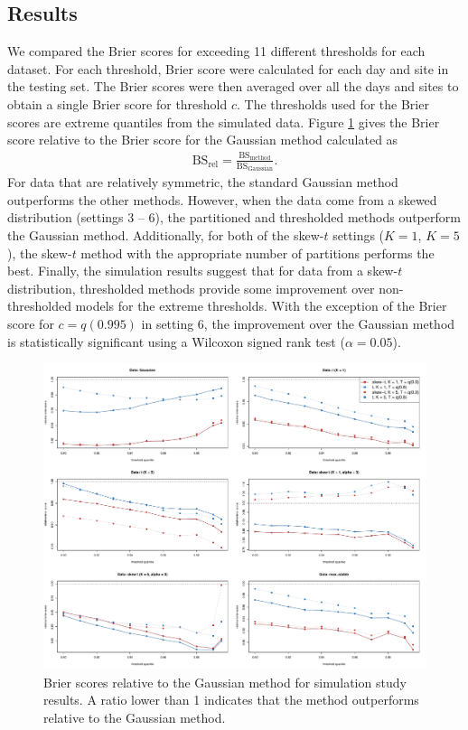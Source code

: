\documentclass[11pt]{article}
\begin{document}
\subsection{Results}\label{s:simresults}
We compared the Brier scores for exceeding 11 different thresholds for each dataset.
For each threshold, Brier score were calculated for each day and site in the testing set.
The Brier scores were then averaged over all the days and sites to obtain a single Brier score for threshold $c$.
The thresholds used for the Brier scores are extreme quantiles from the simulated data.
Figure \ref{fig:simbrierscores} gives the Brier score relative to the Brier score for the Gaussian method calculated as
\begin{align*}
  \text{BS}_{\text{rel}} = \frac{\text{BS}_{\text{method}}}{\text{BS}_{\text{Gaussian}}}.
\end{align*}
For data that are relatively symmetric, the standard Gaussian method outperforms the other methods.
However, when the data come from a skewed distribution (settings 3 -- 6), the partitioned and thresholded methods outperform the Gaussian method.
Additionally, for both of the skew-$t$ settings ($K = 1$, $K = 5$), the skew-$t$ method with the appropriate number of partitions performs the best.
Finally, the simulation results suggest that for data from a skew-$t$ distribution, thresholded methods provide some improvement over non-thresholded models for the extreme thresholds.
With the exception of the Brier score for $c = q(0.995)$ in setting 6, the improvement over the Gaussian method is statistically significant using a Wilcoxon signed rank test ($\alpha = 0.05$).


\begin{figure}
  \includegraphics[width=\linewidth]{plots/bsplots-mean.pdf}
  \caption{Brier scores relative to the Gaussian method for simulation study results. A ratio lower than 1 indicates that the method outperforms relative to the Gaussian method.}
  \label{fig:simbrierscores}
\end{figure}
\end{document}
